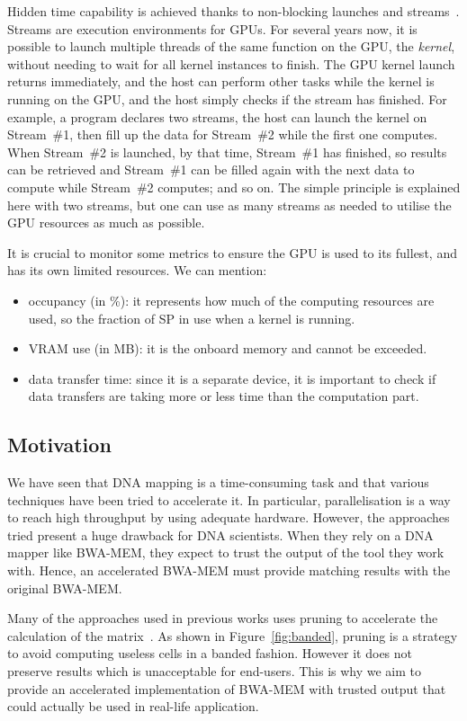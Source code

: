 Hidden time capability is achieved thanks to non-blocking launches and streams~\cite{misc:cudastreams}. Streams are execution environments for GPUs. For several years now, it is possible to launch multiple threads of the same function on the GPU, the \emph{kernel}, without needing to wait for all kernel instances to finish. The GPU kernel launch returns immediately, and the host can perform other tasks while the kernel is running on the GPU, and the host simply checks if the stream has finished. For example, a program declares two streams, the host can launch the kernel on Stream~\#1, then fill up the data for Stream~\#2 while the first one computes. When Stream~\#2 is launched, by that time, Stream~\#1 has finished, so results can be retrieved and Stream~\#1 can be filled again with the next data to compute while Stream~\#2 computes; and so on. The simple principle is explained here with two streams, but one can use as many streams as needed to utilise the GPU resources as much as possible.

It is crucial to monitor some metrics to ensure the GPU is used to its fullest, and has its own limited resources. We can mention:

\begin{itemize}
	\item occupancy (in \%): it represents how much of the computing resources are used, so the fraction of SP in use when a kernel is running.
	\item VRAM use (in MB): it is the onboard memory and cannot be exceeded.
	\item data transfer time: since it is a separate device, it is important to check if data transfers are taking more or less time than the computation part.
\end{itemize}

\subsection{Motivation}
We have seen that DNA mapping is a time-consuming task and that various techniques have been tried to accelerate it. In particular, parallelisation is a way to reach high throughput by using adequate hardware. However, the approaches tried present a huge drawback for DNA scientists. When they rely on a DNA mapper like BWA-MEM, they expect to trust the output of the tool they work with. Hence, an accelerated BWA-MEM must provide matching results with the original BWA-MEM.

Many of the approaches used in previous works uses pruning to accelerate the calculation of the matrix~\cite{Chen:acc}. As shown in Figure~\ref{fig:banded}, pruning is a strategy to avoid computing useless cells in a banded fashion. However it does not preserve results which is unacceptable for end-users. This is why we aim to provide an accelerated implementation of BWA-MEM with trusted output that could actually be used in real-life application.

